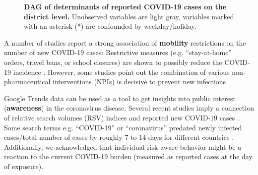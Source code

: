 \documentclass[10pt,letterpaper]{article}
\begin{document}

\begin{figure}[!h]
\caption{{\bf DAG of determinants of reported COVID-19 cases on the district level.}
Unobserved variables are light gray, variables marked with an asterisk (*) are confounded by weekday/holiday.}
\label{fig:dag-covid-19}
\end{figure}

A number of studies report a strong association of \textbf{mobility}
restrictions on the number of new COVID-19 cases: Restrictive measures
(e.g. ``stay-at-home'' orders, travel bans, or school closures) are
shown to possibly reduce the COVID-19 incidence
\cite{chang_modeling_2020, Chinazzi395, fowler_effect_2020, kraemer_effect_2020, lasry_timing_2020, linka_outbreak_2020, mazzoli_effects_2020, xiong_data-driven_2020}.
However, some studies point out the combination of various
non-pharmaceutical interventions (NPIs) is decisive to prevent new
infections \cite{juni_impact_2020, lai_effect_2020}.

Google Trends \cite{google_trends} data can be used as a tool to get
insights into public interest (\textbf{awareness}) in the coronavirus
disease. Several recent studies imply a connection of relative search
volumes (RSV) indices and reported new COVID-19 cases
\cite{ayyoubzadeh_predicting_2020, effenberger_association_2020, higgins_correlations_2020, li_retrospective_2020, lin_google_2020, mavragani_tracking_2020, walker_use_2020, yuan_trends_2020, zhou_effects_2020}.
Some search terms e.g. ``COVID-19'' or ``coronavirus'' predated newly
infected cases/total number of cases by roughly 7 to 14 days for
different countries
\cite{effenberger_association_2020, higgins_correlations_2020, li_retrospective_2020, yuan_trends_2020}.
Additionally, we acknowledged that individual risk-aware behavior might
be a reaction to the current COVID-19 burden (measured as reported cases
at the day of exposure).
\end{document}

